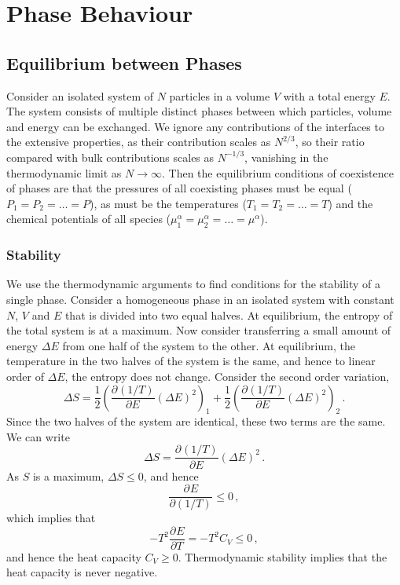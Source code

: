 \documentclass{article}
\theoremstyle{plain}\theoremheaderfont{\normalfont\bfseries}\theorembodyfont{\rmfamily}\theoremseparator{.}\newtheorem*{thm}{Theorem}\newtheorem*{law}{Law}\newtheorem*{pos}{Postulate}
\numberwithin{equation}{section}
\newcommand{\pdv}[3][]{\frac{\partial^{#1} #2}{{\partial #3}^{#1}}}
\begin{document}
    \newpage
    \section{Phase Behaviour}
    \subsection{Equilibrium between Phases}
    Consider an isolated system of \(N\) particles in a volume \(V\) with a total energy \(E\). The system consists of multiple distinct phases between which particles, volume and energy can be exchanged. We ignore any contributions of the interfaces to the extensive properties, as their contribution scales as \(N^{2/3}\), so their ratio compared with bulk contributions scales as \(N^{-1/3}\), vanishing in the thermodynamic limit as \(N\to\infty\). Then the equilibrium conditions of coexistence of phases are that the pressures of all coexisting phases must be equal (\(P_1=P_2=\dots=P\)), as must be the temperatures (\(T_1=T_2=\dots=T\)) and the chemical potentials of all species (\(\mu_1^\alpha=\mu_2^\alpha=\dots=\mu^\alpha\)).
    \subsubsection{Stability}
    We use the thermodynamic arguments to find conditions for the stability of a single phase. Consider a homogeneous phase in an isolated system with constant \(N\), \(V\) and \(E\) that is divided into two equal halves. At equilibrium, the entropy of the total system is at a maximum. Now consider transferring a small amount of energy \(\Delta E\) from one half of the system to the other. At equilibrium, the temperature in the two halves of the system is the same, and hence to linear order of \(\Delta E\), the entropy does not change. Consider the second order variation,
    \begin{equation}
        \Delta S=\frac{1}{2}\left(\pdv{(1/T)}{E}(\Delta E)^2\right)_1+\frac{1}{2}\left(\pdv{(1/T)}{E}(\Delta E)^2\right)_2\,.
    \end{equation}
    Since the two halves of the system are identical, these two terms are the same. We can write
    \begin{equation}
        \Delta S=\pdv{(1/T)}{E}(\Delta E)^2\,.
    \end{equation}
    As \(S\) is a maximum, \(\Delta S\le 0\), and hence
    \begin{equation}
        \pdv{E}{(1/T)}\le 0\,,
    \end{equation}
    which implies that
    \begin{equation}
        -T^2\pdv{E}{T}=-T^2C_V\le 0\,,
    \end{equation}
    and hence the heat capacity \(C_V\ge 0\). Thermodynamic stability implies that the heat capacity is never negative.
\end{document}
